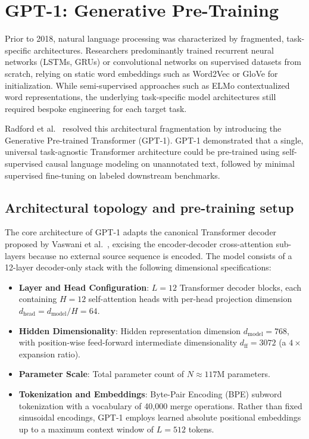 \documentclass[../../../main.tex]{subfiles}
\begin{document}
\section{GPT-1: Generative Pre-Training}
\label{sec:gpt1_architecture}

Prior to 2018, natural language processing was characterized by fragmented, task-specific architectures. Researchers predominantly trained recurrent neural networks (LSTMs, GRUs) or convolutional networks on supervised datasets from scratch, relying on static word embeddings such as Word2Vec or GloVe for initialization. While semi-supervised approaches such as ELMo contextualized word representations, the underlying task-specific model architectures still required bespoke engineering for each target task.

Radford et al.~\cite{radford2018} resolved this architectural fragmentation by introducing the Generative Pre-trained Transformer (GPT-1). GPT-1 demonstrated that a single, universal task-agnostic Transformer architecture could be pre-trained using self-supervised causal language modeling on unannotated text, followed by minimal supervised fine-tuning on labeled downstream benchmarks.


\subsection{Architectural topology and pre-training setup}
\label{subsec:gpt1_setup}

The core architecture of GPT-1 adapts the canonical Transformer decoder proposed by Vaswani et al.~\cite{vaswani2017}, excising the encoder-decoder cross-attention sub-layers because no external source sequence is encoded. The model consists of a 12-layer decoder-only stack with the following dimensional specifications:
\begin{itemize}
    \item \textbf{Layer and Head Configuration}: $L = 12$ Transformer decoder blocks, each containing $H = 12$ self-attention heads with per-head projection dimension $d_{\text{head}} = d_{\text{model}} / H = 64$.
    \item \textbf{Hidden Dimensionality}: Hidden representation dimension $d_{\text{model}} = 768$, with position-wise feed-forward intermediate dimensionality $d_{\text{ff}} = 3072$ (a $4\times$ expansion ratio).
    \item \textbf{Parameter Scale}: Total parameter count of $N \approx 117\text{M}$ parameters.
    \item \textbf{Tokenization and Embeddings}: Byte-Pair Encoding (BPE) subword tokenization with a vocabulary of 40,000 merge operations. Rather than fixed sinusoidal encodings, GPT-1 employs learned absolute positional embeddings up to a maximum context window of $L = 512$ tokens.
\end{itemize}
\end{document}
